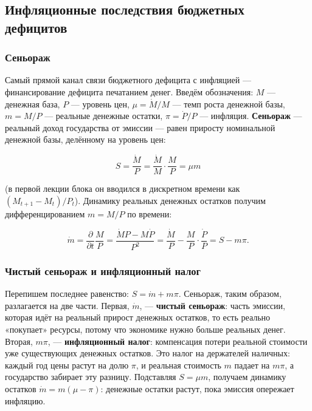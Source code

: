 \documentclass[11pt,a4paper]{article}
\begin{document}
\subsection{Инфляционные последствия бюджетных дефицитов}

\subsubsection{Сеньораж}

Самый прямой канал связи бюджетного дефицита с инфляцией --- финансирование дефицита печатанием денег. Введём обозначения: $M$ --- денежная база, $P$ --- уровень цен, $\mu=\dot M/M$ --- темп роста денежной базы, $m=M/P$ --- реальные денежные остатки, $\pi=\dot P/P$ --- инфляция. \textbf{Сеньораж} --- реальный доход государства от эмиссии --- равен приросту номинальной денежной базы, делённому на уровень цен:
\begin{formulabox}
\begin{equation*}
S=\frac{\dot M}{P}=\frac{\dot M}{M}\cdot\frac{M}{P}=\mu m
\end{equation*}
\end{formulabox}
(в первой лекции блока он вводился в дискретном времени как $(M_{t+1}-M_t)/P_t$). Динамику реальных денежных остатков получим дифференцированием $m=M/P$ по времени:
\begin{formulabox}
\begin{equation*}
\dot m=\frac{\partial}{\partial t}\frac{M}{P}=\frac{\dot MP-M\dot P}{P^2}=\frac{\dot M}{P}-\frac{M}{P}\cdot\frac{\dot P}{P}=S-m\pi.
\end{equation*}
\end{formulabox}

\subsubsection{Чистый сеньораж и инфляционный налог}

Перепишем последнее равенство: $S=\dot m+m\pi$. Сеньораж, таким образом, разлагается на две части. Первая, $\dot m$, --- \textbf{чистый сеньораж}: часть эмиссии, которая идёт на реальный прирост денежных остатков, то есть реально «покупает» ресурсы, потому что экономике нужно больше реальных денег. Вторая, $m\pi$, --- \textbf{инфляционный налог}: компенсация потери реальной стоимости уже существующих денежных остатков. Это налог на держателей наличных: каждый год цены растут на долю $\pi$, и реальная стоимость $m$ падает на $m\pi$, а государство забирает эту разницу. Подставляя $S=\mu m$, получаем динамику остатков $\dot m=m(\mu-\pi)$: денежные остатки растут, пока эмиссия опережает инфляцию.
\end{document}
